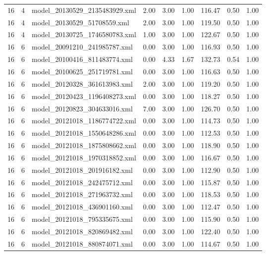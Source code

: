 \begin{table}[ht]
\begin{tabular}{rrlrrrrrr}
   16 &   4 & model\_20130529\_2135483929.xml & 2.00 & 3.00 & 1.00 & 116.47 & 0.50 & 1.00 \\ 
   16 &   4 & model\_20130529\_51708559.xml & 2.00 & 3.00 & 1.00 & 119.50 & 0.50 & 1.00 \\ 
   16 &   4 & model\_20130725\_1746580783.xml & 1.00 & 3.00 & 1.00 & 122.67 & 0.50 & 1.00 \\ 
   16 &   6 & model\_20091210\_241985787.xml & 0.00 & 3.00 & 1.00 & 116.93 & 0.50 & 1.00 \\ 
   16 &   6 & model\_20100416\_811483774.xml & 0.00 & 4.33 & 1.67 & 132.73 & 0.54 & 1.00 \\ 
   16 &   6 & model\_20100625\_251719781.xml & 0.00 & 3.00 & 1.00 & 116.63 & 0.50 & 1.00 \\ 
   16 &   6 & model\_20120328\_361613983.xml & 2.00 & 3.00 & 1.00 & 119.20 & 0.50 & 1.00 \\ 
   16 &   6 & model\_20120423\_1196408273.xml & 0.00 & 3.00 & 1.00 & 118.27 & 0.50 & 1.00 \\ 
   16 &   6 & model\_20120823\_304633016.xml & 7.00 & 3.00 & 1.00 & 126.70 & 0.50 & 1.00 \\ 
   16 &   6 & model\_20121018\_1186774722.xml & 0.00 & 3.00 & 1.00 & 114.73 & 0.50 & 1.00 \\ 
   16 &   6 & model\_20121018\_1550648286.xml & 0.00 & 3.00 & 1.00 & 112.53 & 0.50 & 1.00 \\ 
   16 &   6 & model\_20121018\_1875808662.xml & 0.00 & 3.00 & 1.00 & 118.90 & 0.50 & 1.00 \\ 
   16 &   6 & model\_20121018\_1970318852.xml & 0.00 & 3.00 & 1.00 & 116.67 & 0.50 & 1.00 \\ 
   16 &   6 & model\_20121018\_201916182.xml & 0.00 & 3.00 & 1.00 & 112.90 & 0.50 & 1.00 \\ 
   16 &   6 & model\_20121018\_242475712.xml & 0.00 & 3.00 & 1.00 & 115.87 & 0.50 & 1.00 \\ 
   16 &   6 & model\_20121018\_271963732.xml & 0.00 & 3.00 & 1.00 & 118.53 & 0.50 & 1.00 \\ 
   16 &   6 & model\_20121018\_436901160.xml & 0.00 & 3.00 & 1.00 & 112.47 & 0.50 & 1.00 \\ 
   16 &   6 & model\_20121018\_795335675.xml & 0.00 & 3.00 & 1.00 & 115.90 & 0.50 & 1.00 \\ 
   16 &   6 & model\_20121018\_820869482.xml & 0.00 & 3.00 & 1.00 & 122.40 & 0.50 & 1.00 \\ 
   16 &   6 & model\_20121018\_880874071.xml & 0.00 & 3.00 & 1.00 & 114.67 & 0.50 & 1.00 \\ 

\end{tabular}
\end{table}
